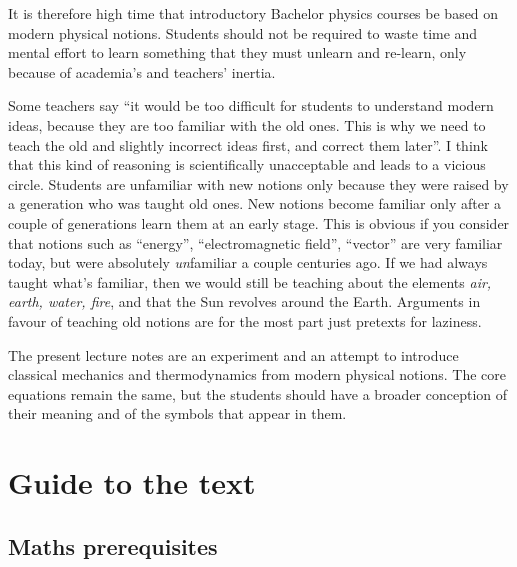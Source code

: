 \documentclass[a4paper,12pt,%
onecolumn,oneside,titlepage,%
british%
]{memoir}
\newcommand{\addsec}[1]{\section*{#1}\addcontentsline{toc}{section}{#1}}
\renewcommand*{\|}[1][]{\nonscript\:#1\vert\nonscript\:\mathopen{}}
\begin{document}
\medskip

It is therefore high time that introductory Bachelor physics courses be based on modern physical notions. Students should not be required to waste time and mental effort to learn something that they must unlearn and re-learn, only because of academia's and teachers' inertia.

Some teachers say \enquote{it would be too difficult for students to understand modern ideas, because they are too familiar with the old ones. This is why we need to teach the old and slightly incorrect ideas first, and correct them later}. I think that this kind of reasoning is scientifically unacceptable and leads to a vicious circle. Students are unfamiliar with new notions only because they were raised by a generation who was taught old ones. New notions become familiar only after a couple of generations learn them at an early stage. This is obvious if you consider that notions such as \enquote{energy}, \enquote{electromagnetic field}, \enquote{vector} are very familiar today, but were absolutely \emph{un}familiar a couple centuries ago. If we had always taught what's familiar, then we would still be teaching about the elements \emph{air, earth, water, fire}, and that the Sun revolves around the Earth. Arguments in favour of teaching old notions are for the most part just pretexts for laziness.

\medskip

The present lecture notes are an experiment and an attempt to introduce classical mechanics and thermodynamics from modern physical notions. The core equations remain the same, but the students should have a broader conception of their meaning and of the symbols that appear in them.



%

\printpagenotes*
\clearpage
\chapter{Guide to the text}
\label{cha:guide}

\addsec{Maths prerequisites}
\label{sec:guide_maths}
\end{document}
